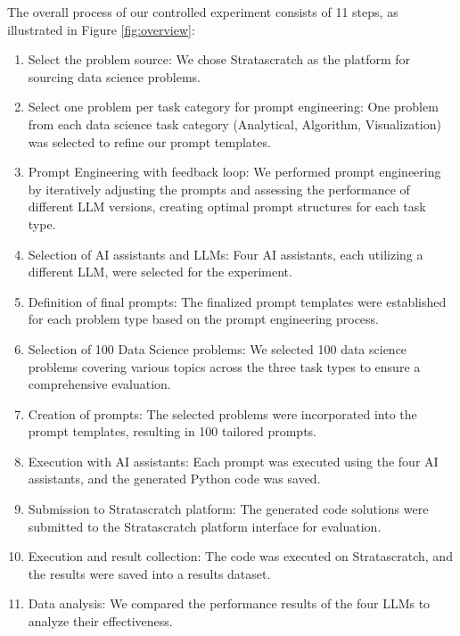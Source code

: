 \documentclass[conference]{IEEEtran}
\begin{document}
 The overall process of our controlled experiment consists of 11 steps, as illustrated in Figure \ref{fig:overview}:


\begin{enumerate}
    \item Select the problem source: We chose Stratascratch \cite{stratascratch_master_coding} as the platform for sourcing data science problems.
    \item Select one problem per task category for prompt engineering: One problem from each data science task category (Analytical, Algorithm, Visualization) was selected to refine our prompt templates.
    \item Prompt Engineering with feedback loop: We performed prompt engineering by iteratively adjusting the prompts and assessing the performance of different LLM versions, creating optimal prompt structures for each task type.
    \item Selection of AI assistants and LLMs: Four AI assistants, each utilizing a different LLM, were selected for the experiment.
    \item Definition of final prompts: The finalized prompt templates were established for each problem type based on the prompt engineering process.
    \item Selection of 100 Data Science problems: We selected 100 data science problems covering various topics across the three task types to ensure a comprehensive evaluation.
    \item Creation of prompts: The selected problems were incorporated into the prompt templates, resulting in 100 tailored prompts.
    \item Execution with AI assistants: Each prompt was executed using the four AI assistants, and the generated Python code was saved.
    \item Submission to Stratascratch platform: The generated code solutions were submitted to the Stratascratch platform interface for evaluation.
    \item Execution and result collection: The code was executed on Stratascratch, and the results were saved into a results dataset.
    \item Data analysis: We compared the performance results of the four LLMs to analyze their effectiveness.
\end{enumerate}
\end{document}
